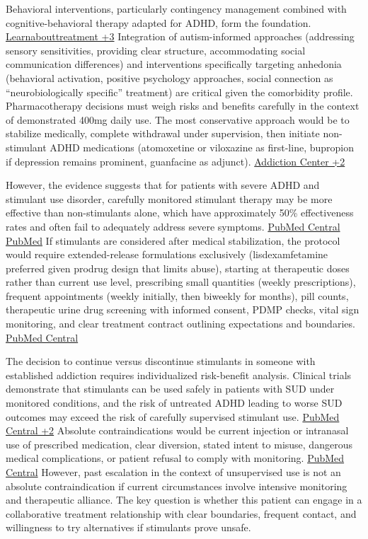 Behavioral interventions, particularly contingency management combined with cognitive-behavioral therapy adapted for ADHD, form the foundation. \href{https://www.learnabouttreatment.org/treatment/treatment-for-stimulant-use-disorder/}{Learnabouttreatment +3} Integration of autism-informed approaches (addressing sensory sensitivities, providing clear structure, accommodating social communication differences) and interventions specifically targeting anhedonia (behavioral activation, positive psychology approaches, social connection as ``neurobiologically specific'' treatment) are critical given the comorbidity profile. Pharmacotherapy decisions must weigh risks and benefits carefully in the context of demonstrated 400mg daily use. The most conservative approach would be to stabilize medically, complete withdrawal under supervision, then initiate non-stimulant ADHD medications (atomoxetine or viloxazine as first-line, bupropion if depression remains prominent, guanfacine as adjunct). \href{https://www.addictioncenter.com/treatment/drug-tapering/}{Addiction Center +2}

However, the evidence suggests that for patients with severe ADHD and stimulant use disorder, carefully monitored stimulant therapy may be more effective than non-stimulants alone, which have approximately 50\% effectiveness rates and often fail to adequately address severe symptoms. \href{https://pmc.ncbi.nlm.nih.gov/articles/PMC2676785/}{PubMed Central} \href{https://pubmed.ncbi.nlm.nih.gov/17453606/}{PubMed} If stimulants are considered after medical stabilization, the protocol would require extended-release formulations exclusively (lisdexamfetamine preferred given prodrug design that limits abuse), starting at therapeutic doses rather than current use level, prescribing small quantities (weekly prescriptions), frequent appointments (weekly initially, then biweekly for months), pill counts, therapeutic urine drug screening with informed consent, PDMP checks, vital sign monitoring, and clear treatment contract outlining expectations and boundaries. \href{https://pmc.ncbi.nlm.nih.gov/articles/PMC2676785/}{PubMed Central}

The decision to continue versus discontinue stimulants in someone with established addiction requires individualized risk-benefit analysis. Clinical trials demonstrate that stimulants can be used safely in patients with SUD under monitored conditions, and the risk of untreated ADHD leading to worse SUD outcomes may exceed the risk of carefully supervised stimulant use. \href{https://pmc.ncbi.nlm.nih.gov/articles/PMC2676785/}{PubMed Central +2} Absolute contraindications would be current injection or intranasal use of prescribed medication, clear diversion, stated intent to misuse, dangerous medical complications, or patient refusal to comply with monitoring. \href{https://pmc.ncbi.nlm.nih.gov/articles/PMC2676785/}{PubMed Central} However, past escalation in the context of unsupervised use is not an absolute contraindication if current circumstances involve intensive monitoring and therapeutic alliance. The key question is whether this patient can engage in a collaborative treatment relationship with clear boundaries, frequent contact, and willingness to try alternatives if stimulants prove unsafe.

